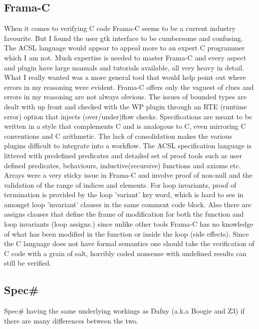 \documentclass[10pt]{article} %
\begin{document}
\subsection{Frama-C}
	When it comes to verifying C code Frama-C seems to be a current industry favourite. But I found the user gtk interface to be cumbersome and confusing. The ACSL language would appear to appeal more to an expert C programmer which I am not. Much expertise is needed to master Frama-C and every aspect and plugin have large manuals and tutorials available, all very heavy in detail. What I really wanted was a more general tool that would help point out where errors in my reasoning were evident. Frama-C offers only the vaguest of clues and errors in my reasoning are not always obvious. The issues of bounded types are dealt with up front and checked with the WP plugin through an RTE (runtime error) option that injects (over\slash under)flow checks. Specifications are meant to be written in a style that complements C and is analogous to C, even mirroring C conventions and C arithmetic. The lack of consolidation makes the various plugins difficult to integrate into a workflow. The ACSL specification language is littered with predefined predicates and detailed set of proof tools such as user defined predicates, behaviours, inductive(recursive) functions and axioms etc. Arrays were a very sticky issue in Frama-C and involve proof of non-null and the validation of the range of indices and elements. For loop invariants, proof of termination is provided by the loop 'variant' key word, which is hard to see in amongst loop 'invariant' clauses in the same comment code block. Also there are assigns clauses that define the frame of modification for both the function and loop invariants (loop assigns.) since unlike other tools Frama-C has no knowledge of what has been modified in the function or inside the loop (side effects). Since the C language does not have formal semantics one should take the verification of C code with a grain of salt, horribly coded nonsense with undefined results can still be verified.
\subsection{Spec\#}
	Spec\# having the same underlying workings as Dafny (a.k.a Boogie and Z3) if there are many differences between the two.
\newpage
\end{document}
